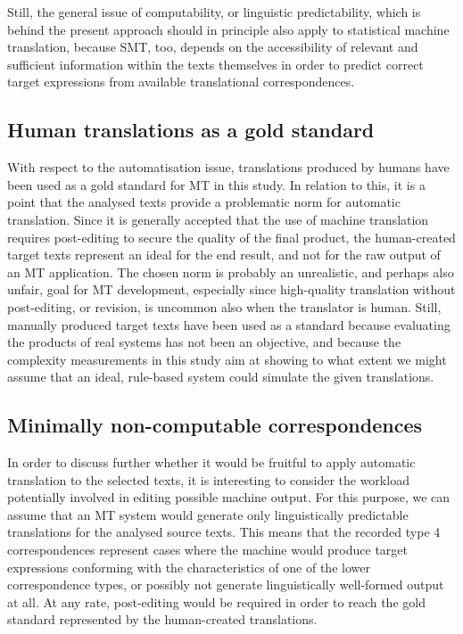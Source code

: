 \documentclass[output=paper]{LSP/langsci}
\begin{document}
Still, the general issue of computability, or linguistic predictability, which is behind the present approach should in principle also apply to statistical machine translation, because SMT, too, depends on the accessibility of relevant and sufficient information within the texts themselves in order to predict correct target expressions from available translational correspondences.

\subsection{Human translations as a gold standard}\label{sec:thunes:5.1}

With respect to the automatisation issue, translations produced by humans have been used as a gold standard for MT in this study. In relation to this, it is a point that the analysed texts provide a problematic norm for automatic translation. Since it is generally accepted that the use of machine translation requires post-editing to secure the quality of the final product, the human-created target texts represent an ideal for the end result, and not for the raw output of an MT application. The chosen norm is probably an unrealistic, and perhaps also unfair, goal for MT development, especially since high-quality translation without post-editing, or revision, is uncommon also when the translator is human. Still, manually produced target texts have been used as a standard because evaluating the products of real systems has not been an objective, and because the complexity measurements in this study aim at showing to what extent we might assume that an ideal, rule-based system could simulate the given translations.

\subsection{Minimally non-computable correspondences}\label{sec:thunes:5.2}

In order to discuss further whether it would be fruitful to apply automatic translation to the selected texts, it is interesting to consider the workload potentially involved in editing possible machine output. For this purpose, we can assume that an MT system would generate only linguistically predictable translations for the analysed source texts. This means that the recorded type 4 correspondences represent cases where the machine would produce target expressions conforming with the characteristics of one of the lower correspondence types, or possibly not generate linguistically well-formed output at all. At any rate, post-editing would be required in order to reach the gold standard represented by the human-created translations.
\end{document}
